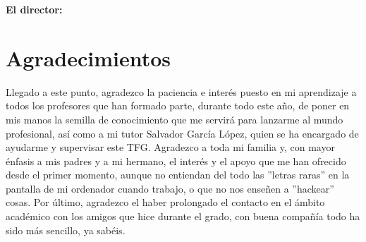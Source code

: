 \vspace{1cm}

\textbf{El director:}

\vspace{5cm}

\noindent \textbf{\myProf}

\chapter*{Agradecimientos}
\thispagestyle{empty}

       \vspace{1cm}

Llegado a este punto, agradezco la paciencia e interés puesto en mi aprendizaje a todos los profesores que han formado parte, durante todo este año, de poner en mis manos la semilla de conocimiento que me servirá para lanzarme al mundo profesional, así como a mi tutor Salvador García López, quien se ha encargado de ayudarme y supervisar este TFG.
Agradezco a toda mi familia y, con mayor énfasis a mis padres y a mi hermano, el interés y el apoyo que me han ofrecido desde el primer momento, aunque no entiendan del todo las ''letras raras'' en la pantalla de mi ordenador cuando trabajo, o que no nos enseñen a ''hackear'' cosas. Por último, agradezco el haber prolongado el contacto en el ámbito académico con los amigos que hice durante el grado, con buena compañía todo ha sido más sencillo, ya sabéis.
